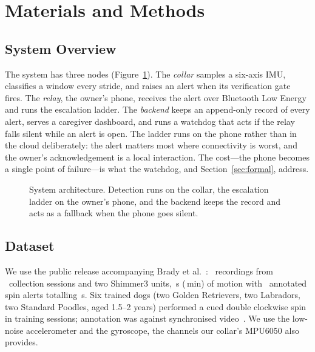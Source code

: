 \section{Materials and Methods}
\label{sec:methods}

\subsection{System Overview}
The system has three nodes (Figure~\ref{fig:arch}). The \emph{collar} samples a six-axis IMU, classifies a window every stride, and raises an alert when its verification gate fires. The \emph{relay}, the owner's phone, receives the alert over Bluetooth Low Energy and runs the escalation ladder. The \emph{backend} keeps an append-only record of every alert, serves a caregiver dashboard, and runs a watchdog that acts if the relay falls silent while an alert is open. The ladder runs on the phone rather than in the cloud deliberately: the alert matters most where connectivity is worst, and the owner's acknowledgement is a local interaction. The cost---the phone becomes a single point of failure---is what the watchdog, and Section~\ref{sec:formal}, address.

\begin{figure}[H]
\centering
\resizebox{\linewidth}{!}{}
\caption{System architecture. Detection runs on the collar, the escalation ladder on the owner's phone, and the backend keeps the record and acts as a fallback when the phone goes silent.\label{fig:arch}}
\end{figure}

\subsection{Dataset}
\label{sec:data}
We use the public release accompanying Brady et al.~\cite{brady2025collar,song2025figshare}: ~recordings from ~collection sessions and two Shimmer3 units, \,s (\,min) of motion with ~annotated spin alerts totalling \,s. Six trained dogs (two Golden Retrievers, two Labradors, two Standard Poodles, aged 1.5--2 years) performed a cued double clockwise spin in training sessions; annotation was against synchronised video~\cite{brady2025collar}. We use the low-noise accelerometer and the gyroscope, the channels our collar's MPU6050 also provides.

